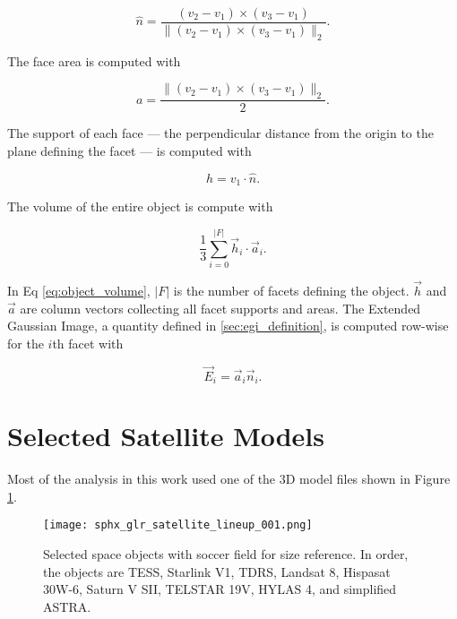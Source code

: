 \begin{equation} \label{eq:facet_normal}
    \hat{n} = \frac{\left( v_2 - v_1 \right) \times \left( v_3 - v_1 \right)}{\| \left( v_2 - v_1 \right) \times \left( v_3 - v_1 \right) \|_2}.
\end{equation}

The face area is computed with

\begin{equation} \label{eq:facet_areas}
    a = \frac{\| \left( v_2 - v_1 \right) \times \left( v_3 - v_1 \right)\|_2}{2}.
\end{equation}

The support of each face --- the perpendicular distance from the origin to the plane defining the facet --- is computed with

\begin{equation} \label{eq:facet_support}
    h = v_1 \cdot \hat{n}.
\end{equation}

The volume of the entire object is compute with

\begin{equation} \label{eq:object_volume}
    \frac{1}{3} \sum_{i=0}^{ \lvert F \rvert}\vec{h}_i \cdot \vec{a}_i.
\end{equation}

In Eq \ref{eq:object_volume}, $\lvert F \rvert$ is the number of facets defining the object. $\vec{h}$ and $\vec{a}$ are column vectors collecting all facet supports and areas. The Extended Gaussian Image, a quantity defined in \ref{sec:egi_definition}, is computed row-wise for the $i$th facet with

\begin{equation} \label{eq:egi_definition}
    \vec{E}_i = \vec{a}_i \vec{n}_i.
\end{equation}

\section{Selected Satellite Models}

Most of the analysis in this work used one of the 3D model files shown in Figure \ref{fig:satellite_lineup}.

\begin{figure}[ht]
    \centering
    \texttt{[image: sphx\_glr\_satellite\_lineup\_001.png]}
    \caption{Selected space objects with soccer field for size reference. In order, the objects are TESS, Starlink V1, TDRS, Landsat 8, Hispasat 30W-6, Saturn V SII, TELSTAR 19V, HYLAS 4, and simplified ASTRA.
    }
    \label{fig:satellite_lineup}
\end{figure}

